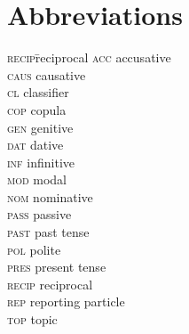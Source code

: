 \documentclass[output=paper]{langsci/langscibook}
\begin{document}
\section*{Abbreviations}
\begin{multicols}{3}
\begin{tabbing}
\textsc{recip}\hspace{1ex}\=reciprocal\kill
\textsc{acc} \> accusative \\
\textsc{caus} \> causative \\
\textsc{cl} \> classifier \\
\textsc{cop} \> copula \\
\textsc{gen} \> genitive \\
\textsc{dat} \> dative \\
\textsc{inf} \> infinitive \\
\textsc{mod} \> modal \\
\textsc{nom} \> nominative \\
\textsc{pass} \> passive \\
\textsc{past} \> past tense \\
\textsc{pol} \> polite \\
\textsc{pres} \> present tense \\
\textsc{recip} \> reciprocal \\
\textsc{rep} \> reporting particle \\
\textsc{top} \> topic
\end{tabbing}
\end{multicols}

{\sloppy\printbibliography[heading=subbibliography,notkeyword=this]}
\end{document}
